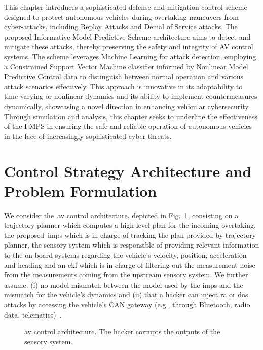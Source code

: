 This chapter introduces a sophisticated defense and mitigation control scheme designed to protect autonomous vehicles  during overtaking maneuvers from cyber-attacks, including Replay Attacks and Denial of Service attacks. The proposed Informative Model Predictive Scheme  architecture aims to detect and mitigate these attacks, thereby preserving the safety and integrity of AV control systems. The scheme leverages Machine Learning for attack detection, employing a Constrained Support Vector Machine classifier informed by Nonlinear Model Predictive Control data to distinguish between normal operation and various attack scenarios effectively. This approach is innovative in its adaptability to time-varying or nonlinear dynamics and its ability to implement countermeasures dynamically, showcasing a novel direction in enhancing vehicular cybersecurity. Through simulation and analysis, this chapter seeks to underline the effectiveness of the I-MPS in ensuring the safe and reliable operation of autonomous vehicles in the face of increasingly sophisticated cyber threats.

\newpage


\section{Control Strategy Architecture and Problem Formulation}
\label{sec:second}
%
We consider the~\gls{av} control architecture, depicted in Fig.~\ref{fig:architecture_attacker}, consisting on a trajectory planner which computes a high-level plan for the incoming overtaking, the proposed~\gls{imps} which is in charge of tracking the plan provided by trajectory planner, the sensory system which is responsible of providing relevant information to the on-board systems regarding the vehicle's velocity, position, acceleration and heading and  an \gls{ekf} which is in charge of filtering out the measurement noise from the measurements coming from the upstream sensory system. We further assume: (i) no model mismatch between the model used by the \gls{imps} and the mismatch for the vehicle's dynamics and (ii) that a hacker can inject \gls{ra} or \gls{dos} attacks by accessing the vehicle's CAN gateway (e.g., through Bluetooth, radio data, telematics)~\cite{bozdal2020evaluation}. 



\begin{figure}[ht]
	\centering
	
	\caption{ \gls{av} control architecture. The hacker corrupts the outputs of the sensory system.}
	\label{fig:architecture_attacker}
\end{figure}
%




